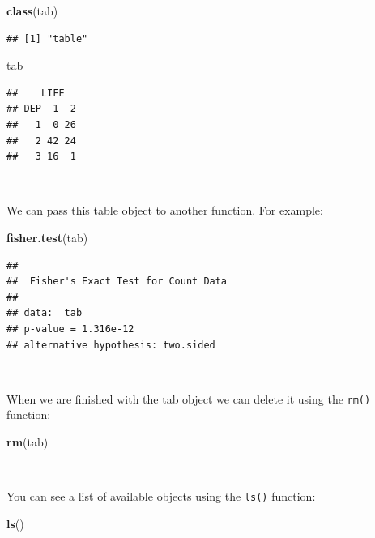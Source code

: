 \documentclass[12pt,a4paper]{book}
\newenvironment{Shaded}{\begin{snugshade}}{\end{snugshade}}
\newcommand{\KeywordTok}[1]{\textcolor[rgb]{0.13,0.29,0.53}{\textbf{#1}}}
\newcommand{\NormalTok}[1]{#1}
\theoremstyle{definition}
\theoremstyle{definition}
\theoremstyle{definition}
\theoremstyle{remark}
\begin{document}
\begin{Shaded}
\begin{Highlighting}[]
\KeywordTok{class}\NormalTok{(tab)}
\end{Highlighting}
\end{Shaded}

\begin{verbatim}
## [1] "table"
\end{verbatim}

\begin{Shaded}
\begin{Highlighting}[]
\NormalTok{tab}
\end{Highlighting}
\end{Shaded}

\begin{verbatim}
##    LIFE
## DEP  1  2
##   1  0 26
##   2 42 24
##   3 16  1
\end{verbatim}

~

We can pass this table object to another function. For example:

\begin{Shaded}
\begin{Highlighting}[]
\KeywordTok{fisher.test}\NormalTok{(tab)}
\end{Highlighting}
\end{Shaded}

\begin{verbatim}
## 
##  Fisher's Exact Test for Count Data
## 
## data:  tab
## p-value = 1.316e-12
## alternative hypothesis: two.sided
\end{verbatim}

~

When we are finished with the tab object we can delete it using the
\texttt{rm()} function:

\begin{Shaded}
\begin{Highlighting}[]
\KeywordTok{rm}\NormalTok{(tab)}
\end{Highlighting}
\end{Shaded}

~

You can see a list of available objects using the \texttt{ls()}
function:

\begin{Shaded}
\begin{Highlighting}[]
\KeywordTok{ls}\NormalTok{()}
\end{Highlighting}
\end{Shaded}
\end{document}
